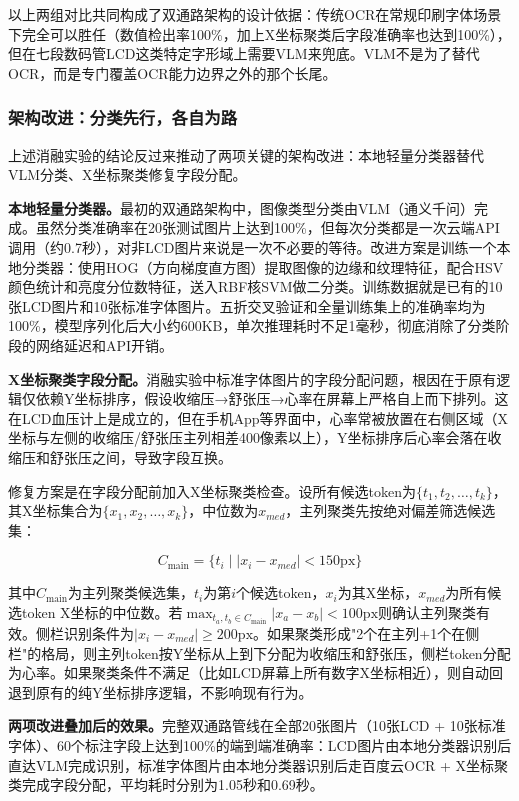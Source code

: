 \documentclass[zihao=-4,a4paper]{ctexart}
\numberwithin{figure}{section}
\numberwithin{table}{section}
\begin{document}
以上两组对比共同构成了双通路架构的设计依据：传统OCR在常规印刷字体场景下完全可以胜任（数值检出率100\%，加上X坐标聚类后字段准确率也达到100\%），但在七段数码管LCD这类特定字形域上需要VLM来兜底。VLM不是为了替代OCR，而是专门覆盖OCR能力边界之外的那个长尾。

\subsubsection{架构改进：分类先行，各自为路}

上述消融实验的结论反过来推动了两项关键的架构改进：本地轻量分类器替代VLM分类、X坐标聚类修复字段分配。

\textbf{本地轻量分类器。}最初的双通路架构中，图像类型分类由VLM（通义千问）完成。虽然分类准确率在20张测试图片上达到100\%，但每次分类都是一次云端API调用（约0.7秒），对非LCD图片来说是一次不必要的等待。改进方案是训练一个本地分类器：使用HOG（方向梯度直方图）提取图像的边缘和纹理特征，配合HSV颜色统计和亮度分位数特征，送入RBF核SVM做二分类。训练数据就是已有的10张LCD图片和10张标准字体图片。五折交叉验证和全量训练集上的准确率均为100\%，模型序列化后大小约600KB，单次推理耗时不足1毫秒，彻底消除了分类阶段的网络延迟和API开销。

\textbf{X坐标聚类字段分配。}消融实验中标准字体图片的字段分配问题，根因在于原有逻辑仅依赖Y坐标排序，假设收缩压→舒张压→心率在屏幕上严格自上而下排列。这在LCD血压计上是成立的，但在手机App等界面中，心率常被放置在右侧区域（X坐标与左侧的收缩压/舒张压主列相差400像素以上），Y坐标排序后心率会落在收缩压和舒张压之间，导致字段互换。

修复方案是在字段分配前加入X坐标聚类检查。设所有候选token为$\{t_1, t_2, \ldots, t_k\}$，其X坐标集合为$\{x_1, x_2, \ldots, x_k\}$，中位数为$x_{med}$，主列聚类先按绝对偏差筛选候选集：

\begin{equation}
C_{\text{main}} = \{t_i \mid |x_i - x_{med}| < 150\text{px}\}
\end{equation}

其中$C_{\text{main}}$为主列聚类候选集，$t_i$为第$i$个候选token，$x_i$为其X坐标，$x_{med}$为所有候选token X坐标的中位数。若$\max_{t_a,t_b \in C_{\text{main}}} |x_a - x_b| < 100\text{px}$则确认主列聚类有效。侧栏识别条件为$|x_i - x_{med}| \geq 200\text{px}$。如果聚类形成"2个在主列+1个在侧栏"的格局，则主列token按Y坐标从上到下分配为收缩压和舒张压，侧栏token分配为心率。如果聚类条件不满足（比如LCD屏幕上所有数字X坐标相近），则自动回退到原有的纯Y坐标排序逻辑，不影响现有行为。

\textbf{两项改进叠加后的效果。}完整双通路管线在全部20张图片（10张LCD + 10张标准字体）、60个标注字段上达到100\%的端到端准确率：LCD图片由本地分类器识别后直达VLM完成识别，标准字体图片由本地分类器识别后走百度云OCR + X坐标聚类完成字段分配，平均耗时分别为1.05秒和0.69秒。
\end{document}

